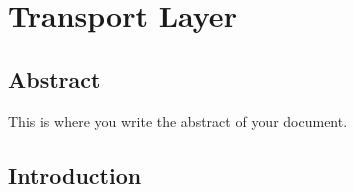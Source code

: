 \chapter[Transport Layer]{Transport Layer}

\section*{Abstract}         %
This is where you write the abstract of your document.

\section{Introduction}
